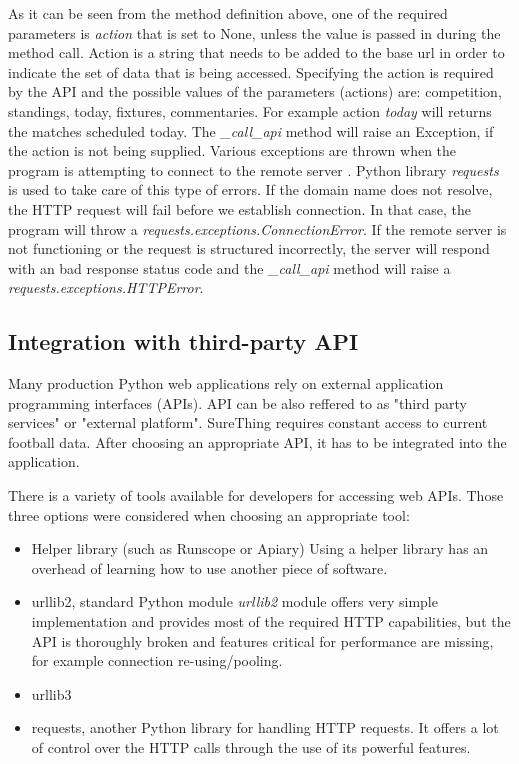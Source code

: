 As it can be seen from the method definition above, one of the required parameters is \emph{action} that is set to None, unless the value is passed in during the method call. Action is a string that needs to be added to the base url in order to indicate the set of data that is being accessed. Specifying the action is required by the API and the possible values of the parameters (actions) are: competition, standings, today, fixtures, commentaries. For example action \emph{today} will returns the matches scheduled today. The \emph{\_call\_api} method will raise an Exception, if the action is not being supplied. Various exceptions are thrown when the program is attempting to connect to the remote server \cite{article:httpRequestsExceptions}. Python library \emph{requests} is used to take care of this type of errors. \cite{documentation:PythonRequests} If the domain name does not resolve, the HTTP request will fail before we establish connection. In that case, the program will throw a \emph{requests.exceptions.ConnectionError}. If the remote server is not functioning or the request is structured incorrectly, the server will respond with an bad response status code and the \emph{\_call\_api} method will raise a \emph{requests.exceptions.HTTPError}.

\subsection{Integration with third-party API}
Many production Python web applications rely on external application programming interfaces (APIs). API can be also reffered to as "third party services" or "external platform".\cite{apiintegration}  SureThing requires constant access to current football data. After choosing an appropriate API, it has to be integrated into the application. 

There is a variety of tools available for developers for accessing web APIs. Those three options were considered when choosing an appropriate tool:
	
\begin{itemize}
	\item Helper library (such as Runscope or Apiary)
	Using a helper library has an overhead of learning how to use another piece of software.
	\item urllib2, standard Python module
	\emph{urllib2} module offers very simple implementation and provides most of the required HTTP capabilities, but the API is thoroughly broken and features critical for performance are missing, for example connection re-using/pooling. 
	\item urllib3
	\item requests, another Python library for handling HTTP requests. It offers a lot of control over the HTTP calls through the use of its powerful features.
\end{itemize}
		
